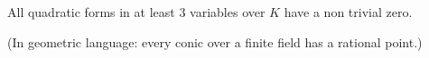 All quadratic forms in at least $3$ variables over $K$ have a non trivial zero.

(In geometric language: every conic over a finite field has a rational point.)
